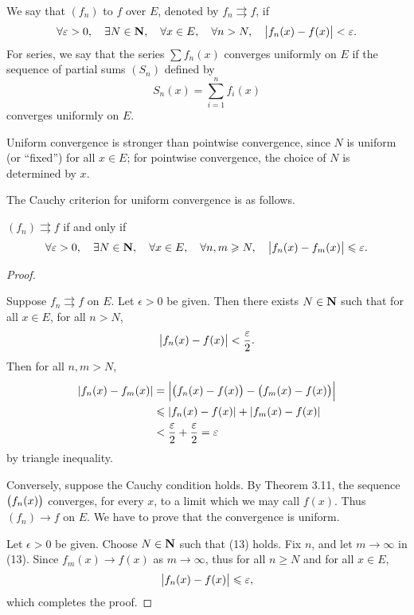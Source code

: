 \begin{definition}
We say that $(f_n)$  to $f$ over $E$, denoted by $f_n\rightrightarrows f$, if 
\[\forall\varepsilon>0,\quad\exists N\in\mathbf N,\quad\forall x\in E,\quad\forall n>N,\quad\left|f_n(x)-f(x)\right|<\varepsilon.\]
For series, we say that the series $\sum f_n(x)$ converges uniformly on $E$ if the sequence of partial sums $(S_n)$ defined by
\[S_n(x)=\sum_{i=1}^{n}f_i(x)\]
converges uniformly on $E$.
\end{definition}

Uniform convergence is stronger than pointwise convergence, since $N$ is uniform (or ``fixed'') for all $x\in E$; for pointwise convergence, the choice of $N$ is determined by $x$.

The Cauchy criterion for uniform convergence is as follows.

\begin{lemma}
$(f_n)\rightrightarrows f$ if and only if
\[\forall\varepsilon>0,\quad\exists N\in\mathbf N,\quad\forall x\in E,\quad\forall n,m\geqslant N,\quad\left|f_n(x)-f_m(x)\right|\leqslant\varepsilon.\]
\end{lemma}

\begin{proof} \

\fbox{$\implies$} Suppose $f_n\rightrightarrows f$ on $E$. Let $\epsilon>0$ be given. Then there exists $N\in\mathbf N$ such that for all $x\in E$, for all $n>N$,
\[\left|f_n(x)-f(x)\right|<\frac{\varepsilon}{2}.\]
Then for all $n,m>N$,
\begin{align*}
|f_n(x)-f_m(x)|
&=\left|\left(f_n(x)-f(x)\right)-\left(f_m(x)-f(x)\right)\right|\\
&\leqslant|f_n(x)-f(x)|+|f_m(x)-f(x)|\\
&<\frac{\varepsilon}{2}+\frac{\varepsilon}{2}=\varepsilon
\end{align*}
by triangle inequality.

\fbox{$\impliedby$} Conversely, suppose the Cauchy condition holds. By Theorem 3.11, the sequence $\left(f_n(x)\right)$ converges, for every $x$, to a limit which we may call $f(x)$. Thus $(f_n)\to f$ on $E$. We have to prove that the convergence is uniform.

Let $\epsilon>0$ be given. Choose $N\in\mathbf N$ such that (13) holds. Fix $n$, and let $m\to\infty$ in (13). Since $f_m(x)\to f(x)$ as $m\to\infty$, thus for all $n\ge N$ and for all $x\in E$,
\[\left|f_n(x)-f(x)\right|\leqslant\varepsilon,\]
which completes the proof.
\end{proof}

